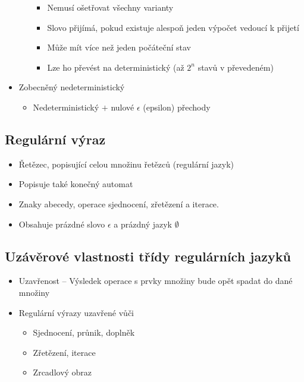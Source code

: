 \documentclass[openany]{book}
\begin{document}
\begin{itemize}
\begin{itemize}
\begin{itemize}
            \item Nemusí ošetřovat všechny varianty
            \item Slovo přijímá, pokud existuje alespoň jeden výpočet vedoucí k přijetí
            \item Může mít více než jeden počáteční stav
            \item Lze ho převést na deterministický (až \(2^n\) stavů v převedeném)
        \end{itemize}
    \end{itemize}
    \item Zobecněný nedeterministický
    \begin{itemize}
        \item Nedeterministický \(+\) nulové \(\epsilon\) (epsilon) přechody
    \end{itemize} 
\end{itemize}

\subsection{Regulární výraz}
\begin{itemize}
    \item Řetězec, popisující celou množinu řetězců (regulární jazyk)
    \item Popisuje také konečný automat
    \item Znaky abecedy, operace sjednocení, zřetězení a iterace.
    \item Obsahuje prázdné slovo \(\epsilon\) a prázdný jazyk \(\emptyset\)
\end{itemize}

\subsection{Uzávěrové vlastnosti třídy regulárních jazyků}
\begin{itemize}
    \item Uzavřenost -- Výsledek operace s prvky množiny bude opět spadat do dané množiny
    \item Regulární výrazy uzavřené vůči
    \begin{itemize}
        \item Sjednocení, průnik, doplněk
        \item Zřetězení, iterace
        \item Zrcadlový obraz
    \end{itemize}
\end{itemize}
\end{document}
